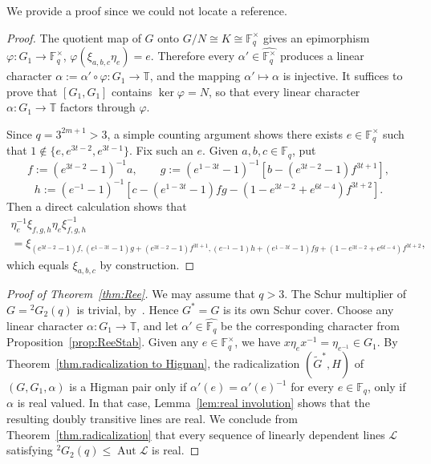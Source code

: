 We provide a proof since we could not locate a reference.

\begin{proof}
The quotient map of $G$ onto $G/N \cong K \cong \mathbb{F}_q^\times$ gives an epimorphism $\varphi \colon G_1 \to \mathbb{F}_q^\times$, $\varphi(\xi_{a,b,c} \eta_e) = e$.
Therefore every $\alpha' \in \widehat{ \mathbb{F}_q^\times }$ produces a linear character $\alpha := \alpha' \circ \varphi \colon G_1 \to \mathbb{T}$, and the mapping $\alpha' \mapsto \alpha$ is injective.
It suffices to prove that $[G_1,G_1]$ contains $\ker \varphi = N$, so that every linear character $\alpha \colon G_1 \to \mathbb{T}$ factors through $\varphi$.


Since $q = 3^{2m+1} > 3$, a simple counting argument shows there exists $e \in \mathbb{F}_q^\times$ such that $1 \notin \{e,e^{3t-2},e^{3t-1}\}$.
Fix such an $e$.
Given $a,b,c \in \mathbb{F}_q$, put
\[
f := (e^{3t-2} - 1)^{-1} a,
\qquad
g := (e^{1-3t} - 1)^{-1}[ b - (e^{3t-2} - 1)f^{3t+1} ],
\]
\[
h := (e^{-1} - 1)^{-1} [ c - (e^{1-3t} - 1)fg - (1 - e^{3t-2} + e^{6t-4})f^{3t+2} ].
\]
Then a direct calculation shows that
\begin{multline*}
\eta_e^{-1} \xi_{f,g,h} \eta_e \xi_{f,g,h}^{-1} \\
=
\xi_{
(e^{3t-2}  - 1)f,
(e^{1-3t} - 1)g + (e^{3t-2} - 1)f^{3t+1},
(e^{-1} - 1)h + (e^{1-3t} - 1)fg + (1-e^{3t-2} + e^{6t-4})f^{3t+2}
},
\end{multline*}
which equals $\xi_{a,b,c}$ by construction.
\end{proof}

\begin{proof}[Proof of Theorem~\ref{thm:Ree}]
We may assume that $q>3$.
The Schur multiplier of $G= {}^2G_2(q)$ is trivial, by~\cite[Theorem~1]{AlperinGorenstein:66}.
Hence $G^*=G$ is its own Schur cover.
Choose any linear character $\alpha \colon G_1 \to \mathbb{T}$, and let $\alpha' \in \widehat{ \mathbb{F}_q }$ be the corresponding character from Proposition~\ref{prop:ReeStab}.
Given any $e \in \mathbb{F}_q^\times$, we have $x\eta_e x^{-1} = \eta_{e^{-1}} \in G_1$.
By Theorem~\ref{thm.radicalization to Higman}, the radicalization $(\widetilde{G}^*,H)$ of $(G,G_1,\alpha)$ is a Higman pair only if $\alpha'(e) = \alpha'(e)^{-1}$ for every $e \in \mathbb{F}_q$, only if $\alpha$ is real valued.
In that case, Lemma~\ref{lem:real involution} shows that the resulting doubly transitive lines are real.
We conclude from Theorem~\ref{thm.radicalization} that every sequence of linearly dependent lines $\mathscr{L}$ satisfying ${}^2G_2(q) \leq \operatorname{Aut}\mathscr{L}$ is real.
\end{proof}


